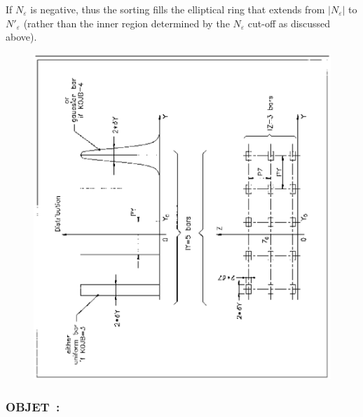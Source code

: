 \noindent If $N_\varepsilon$ is negative, thus the sorting fills the 
elliptical ring that extends from $\left| N_\varepsilon \right|$ to 
$N'_\varepsilon$ (rather than the inner region determined by the $N_\varepsilon$ 
cut-off as discussed above).


\vfill
 \begin{figure}[H]
\centerline{\includegraphics[width=15cm,angle=-90]{Fig5.ps}}  %
 \end{figure}
 \vfill 





\clearpage

 
\subsubsection*{OBJET~:   \OBJETTitl} \label{OBJET} 
\medskip 
{}



